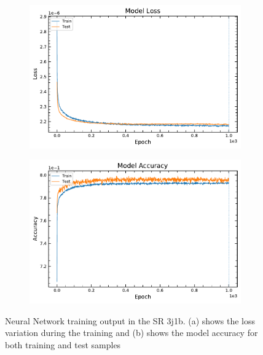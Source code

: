 
\begin{figure}[!h] 
  \vspace*{-0.3cm}
  \begin{subfigure}[b]{0.5\linewidth}
    \centering
    \includegraphics[width=\linewidth]{ubonn-thesis/Chapters/Chapters_06/Figure/SR_3j1b/loss_PLV_3j1b_L27_20_10_06Oct2021.pdf} %
    \caption{} 
    \label{SR:3j1b:loss} 
  \end{subfigure}%
  \begin{subfigure}[b]{0.5\linewidth}
    \centering
    \includegraphics[width=\linewidth]{ubonn-thesis/Chapters/Chapters_06/Figure/SR_3j1b/acc_PLV_3j1b_L27_20_10_06Oct2021.pdf} 
    \caption{} 
    \label{SR:3j1b:acc} 
  \end{subfigure} 
  \vspace*{-0.5cm}
  \caption{Neural Network training output in the SR 3j1b. (a) shows the loss variation during the training and (b) shows the model accuracy for both training and test samples}
  \label{SR:3j1b:NN(b)} 
\end{figure}


